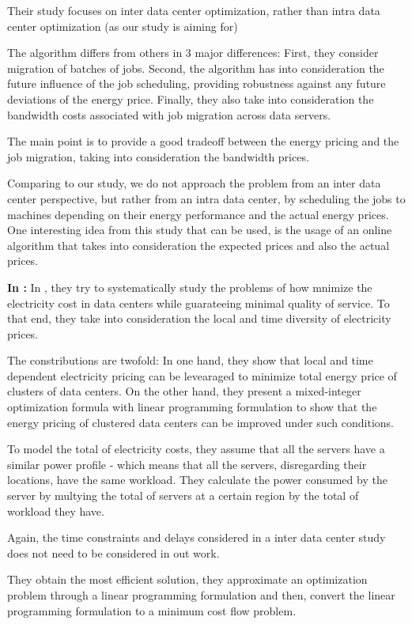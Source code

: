 Their study focuses on inter data center optimization, rather than intra data
center optimization (as our study is aiming for)

The algorithm differs from others in 3 major differences: First, they consider
migration of batches of jobs. Second, the algorithm has into consideration the
future influence of the job scheduling, providing robustness against any future
deviations of the energy price. Finally, they also take into consideration the 
bandwidth costs associated with job migration across data servers.

The main point is to provide a good tradeoff between the energy pricing and the
job migration, taking into consideration the bandwidth prices.

Comparing to our study, we do not approach the problem from an inter data center
perspective, but rather from an intra data center, by scheduling the jobs to
machines depending on their energy performance and the actual energy prices. One
interesting idea from this study that can be used, is the usage of an online
algorithm that takes into consideration the expected prices and also the actual
prices.


\textbf{In \cite{MINIMIZING_DIST}:}
In \cite{MINIMIZING_DIST}, they try to systematically study the problems of how
mnimize the electricity cost in data centers while guarateeing minimal quality
of service. To that end, they take into consideration the local and time diversity 
of electricity prices.

The constributions are twofold: In one hand, they show that local and time
dependent electricity pricing can be levearaged to minimize total energy price
of clusters of data centers. On the other hand, they present a mixed-integer
optimization formula with linear programming formulation to show that the energy
pricing of clustered data centers can be improved under such conditions.

To model the total of electricity costs, they assume that all the servers have a
similar power profile - which means that all the servers, disregarding their
locations, have the same workload. They calculate the power consumed by the
server by multying the total of servers at a certain region by the total of
workload they have. 

Again, the time constraints and delays considered in a inter data center study
does not need to be considered in out work.

They obtain the most efficient solution, they approximate an optimization
problem through a linear programming formulation and then, convert the linear
programming formulation to a minimum cost flow problem. 

